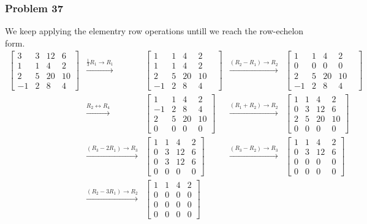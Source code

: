 \documentclass[a4paper,12pt]{article}
\begin{document}
\subsubsection*{Problem 37}
We keep applying the elementry row operations untill we reach the row-echelon form.
\begin{align*}
\begin{bmatrix}
  3 & 3 & 12 &6\\
  1 & 1 & 4 &2\\
  2 & 5 & 20 &10\\
  -1& 2 & 8 & 4
\end{bmatrix}  &\xrightarrow{\frac{1}{3}R_1 \to R_1}& \begin{bmatrix}
  1 & 1 & 4 &2\\
  1 & 1 & 4 &2\\
  2 & 5 & 20 &10\\
  -1& 2 & 8& 4&
\end{bmatrix} &\xrightarrow{(R_2-R_1)\to R_2}& \begin{bmatrix}
  1 & 1 & 4 &2\\
  0 &  0& 0 &0\\
  2 & 5 & 20 &10\\
  -1& 2 & 8& 4&
\end{bmatrix}\\ &\xrightarrow{R_2 \leftrightarrow R_4}& \begin{bmatrix}
  1 & 1 & 4 &2\\
  -1 &  2& 8 &4\\
  2 & 5 & 20 &10\\
  0& 0 & 0& 0
\end{bmatrix} &\xrightarrow{(R_1+R_2)\to R_2}& \begin{bmatrix}
  1 & 1 & 4 &2\\
  0 &  3& 12 &6\\
  2 & 5 & 20 &10\\
  0& 0 & 0& 0
\end{bmatrix}\\ &\xrightarrow{(R_3-2R_1)\to R_3}& \begin{bmatrix}
  1 & 1 & 4 &2\\
  0 &  3& 12 &6\\
  0 & 3 & 12 &6\\
  0& 0 & 0& 0
\end{bmatrix} &\xrightarrow{(R_3-R_2)\to R_3}& \begin{bmatrix}
  1 & 1 & 4 &2\\
  0 &  3& 12 &6\\
  0 & 0& 0 &0\\
  0& 0 & 0& 0
\end{bmatrix} \\ &\xrightarrow{(R_2-3R_1)\to R_2}& \begin{bmatrix}
  1 & 1 & 4 &2\\
  0 &  0& 0 &0\\
  0 & 0& 0 &0\\
  0& 0 & 0& 0
\end{bmatrix}
\end{align*}
\end{document}
